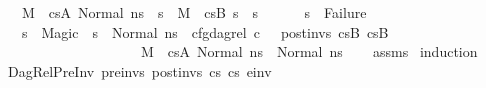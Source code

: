 \begin{isabellebody}
\ \ \ {\isacharparenleft}{\kern0pt}M{\isacharcomma}{\kern0pt}{\isasymLambda}{\isacharcomma}{\kern0pt}{\isasymGamma}{\isacharcomma}{\kern0pt}{\isasymOmega}\ {\isasymturnstile}\ {\isasymlangle}cs{}A{\isacharcomma}{\kern0pt}\ Normal\ ns{}{\isasymrangle}\ {\isacharbrackleft}{\kern0pt}{\isasymrightarrow}{\isacharbrackright}{\kern0pt}\ s{\isacharprime}{\kern0pt}{\isacharprime}{\kern0pt}{\isacharparenright}{\kern0pt}\ {\isasymand}\ {\isacharparenleft}{\kern0pt}M{\isacharcomma}{\kern0pt}{\isasymLambda}{\isacharcomma}{\kern0pt}{\isasymGamma}{\isacharcomma}{\kern0pt}{\isasymOmega}\ {\isasymturnstile}\ {\isasymlangle}cs{}B{\isacharcomma}{\kern0pt}\ s{\isacharprime}{\kern0pt}{\isacharprime}{\kern0pt}{\isasymrangle}\ {\isacharbrackleft}{\kern0pt}{\isasymrightarrow}{\isacharbrackright}{\kern0pt}\ s{\isacharprime}{\kern0pt}{\isacharparenright}{\kern0pt}\ {\isasymand}\ \isanewline
\ \ \ \ s{\isacharprime}{\kern0pt}{\isacharprime}{\kern0pt}\ {\isasymnoteq}\ Failure\ {\isasymand}\isanewline
\ \ \ {\isacharparenleft}{\kern0pt}s{\isacharprime}{\kern0pt}{\isacharprime}{\kern0pt}\ {\isasymnoteq}\ Magic\ {\isasymlongrightarrow}\ s{\isacharprime}{\kern0pt}{\isacharprime}{\kern0pt}\ {\isacharequal}{\kern0pt}\ Normal\ ns{}\ {\isasymand}\ cfg{\isacharunderscore}{\kern0pt}dag{\isacharunderscore}{\kern0pt}rel\ c\ {\isacharbrackleft}{\kern0pt}{\isacharbrackright}{\kern0pt}\ {\isacharbrackleft}{\kern0pt}{\isacharbrackright}{\kern0pt}\ post{\isacharunderscore}{\kern0pt}invs\ cs{}B\ cs{}B\ {\isasymand}\isanewline
\ \ \ \ \ \ \ \ \ \ \ \ \ \ \ \ \ \ \ \ {\isacharparenleft}{\kern0pt}M{\isacharcomma}{\kern0pt}{\isasymLambda}{\isacharcomma}{\kern0pt}{\isasymGamma}{\isacharcomma}{\kern0pt}{\isasymOmega}\ {\isasymturnstile}\ {\isasymlangle}cs{}A{\isacharcomma}{\kern0pt}\ Normal\ ns{}{\isasymrangle}\ {\isacharbrackleft}{\kern0pt}{\isasymrightarrow}{\isacharbrackright}{\kern0pt}\ Normal\ ns{}{\isacharparenright}{\kern0pt}{\isacharparenright}{\kern0pt}{\isacharparenright}{\kern0pt}{\isachardoublequoteclose}\isanewline
%
\isadelimproof
\ \ %
\endisadelimproof
%
\isatagproof
{}\isamarkupfalse%
\ assms\isanewline
{}\isamarkupfalse%
\ {\isacharparenleft}{\kern0pt}induction{\isacharparenright}{\kern0pt}\isanewline
\ \ \isamarkupfalse%
\ {\isacharparenleft}{\kern0pt}DagRel{\isacharunderscore}{\kern0pt}PreInv\ pre{\isacharunderscore}{\kern0pt}invs\ post{\isacharunderscore}{\kern0pt}invs\ cs{}\ cs{}\ e{\isacharunderscore}{\kern0pt}inv{\isacharparenright}{\kern0pt}\isanewline

\end{isabellebody}
